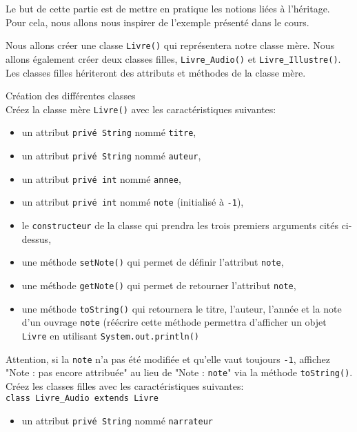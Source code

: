 
Le but de cette partie est de mettre en pratique les notions liées à l'héritage. Pour cela, nous allons nous inspirer de l'exemple présenté dans le cours. 

Nous allons créer une classe \lstinline{Livre()} qui représentera notre classe mère. Nous allons également créer deux classes filles, \lstinline{Livre_Audio()} et \lstinline{Livre_Illustre()}. Les classes filles hériteront des attributs et méthodes de la classe mère. 

\begin{Exercice}[10 minutes] Création des différentes classes\\
Créez la classe mère \lstinline{Livre()} avec les caractéristiques suivantes:
\begin{itemize}
	\item un attribut \lstinline{privé String} nommé \lstinline{titre},
	\item un attribut \lstinline{privé String} nommé \lstinline{auteur},
	\item un attribut \lstinline{privé int} nommé \lstinline{annee},
	\item un attribut \lstinline{privé int} nommé \lstinline{note} (initialisé à \lstinline{-1}),
	\item le \lstinline{constructeur} de la classe qui prendra les trois premiers arguments cités ci-dessus,
	\item une méthode \lstinline{setNote()} qui permet de définir l'attribut \lstinline{note},
	\item une méthode \lstinline{getNote()} qui permet de retourner l'attribut \lstinline{note},
	\item une méthode \lstinline{toString()} qui retournera le titre, l'auteur, l'année et la note d'un ouvrage \lstinline{note} (réécrire cette méthode permettra d'afficher un objet \lstinline{Livre} en utilisant \lstinline{System.out.println()} \\
\end{itemize}

Attention, si la \lstinline{note} n'a pas été modifiée et qu'elle vaut toujours \lstinline{-1}, affichez "Note : pas encore attribuée" au lieu de "Note : \lstinline{note}" via la méthode \lstinline{toString()}. \\


Créez les classes filles avec les caractéristiques suivantes:\\
\lstinline{class Livre_Audio extends Livre}
\begin{itemize}
	\item un attribut \lstinline{privé String} nommé \lstinline{narrateur}


\end{itemize}
\end{Exercice}
